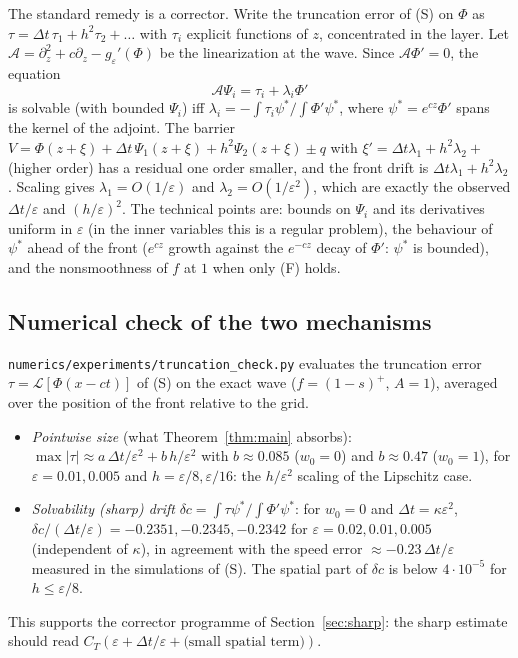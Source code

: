 \documentclass[11pt]{amsart}
\theoremstyle{remark}
\newcommand{\ve}{\varepsilon}
\newcommand{\Lop}{\mathcal{L}}
\begin{document}
The standard remedy is a corrector. Write the truncation error of (S) on
$\Phi$ as $\tau=\Delta t\,\tau_1+h^2\tau_2+\dots$ with $\tau_i$ explicit
functions of $z$, concentrated in the layer. Let $\mathcal A=\partial_z^2+c\partial_z-g_\ve'(\Phi)$
be the linearization at the wave. Since $\mathcal A\Phi'=0$, the equation
\[
\mathcal A\Psi_i=\tau_i+\lambda_i\Phi'
\]
is solvable (with bounded $\Psi_i$) iff
$\lambda_i=-\int\tau_i\psi^*/\int\Phi'\psi^*$, where $\psi^*=e^{cz}\Phi'$
spans the kernel of the adjoint. The barrier
$V=\Phi(z+\xi)+\Delta t\,\Psi_1(z+\xi)+h^2\Psi_2(z+\xi)\pm q$ with
$\xi'=\Delta t\lambda_1+h^2\lambda_2+$(higher order) has a residual one
order smaller, and the front drift is $\Delta t\lambda_1+h^2\lambda_2$. Scaling
gives $\lambda_1=O(1/\ve)$ and $\lambda_2=O(1/\ve^2)$, which are exactly the
observed $\Delta t/\ve$ and $(h/\ve)^2$. The technical points are: bounds on
$\Psi_i$ and its derivatives uniform in $\ve$ (in the inner variables this is a
regular problem), the behaviour of $\psi^*$ ahead of the front ($e^{cz}$
growth against the $e^{-cz}$ decay of $\Phi'$: $\psi^*$ is bounded), and the
nonsmoothness of $f$ at $1$ when only (F) holds.


\subsection*{Numerical check of the two mechanisms}
\texttt{numerics/experiments/truncation\_check.py} evaluates the truncation
error $\tau=\Lop[\Phi(x-ct)]$ of (S) on the exact wave ($f=(1-s)^+$, $A=1$),
averaged over the position of the front relative to the grid.
\begin{itemize}
\item \emph{Pointwise size} (what Theorem~\ref{thm:main} absorbs):
$\max|\tau|\approx a\,\Delta t/\ve^2+b\,h/\ve^2$ with $b\approx0.085$ ($w_0=0$)
and $b\approx0.47$ ($w_0=1$), for $\ve=0.01,0.005$ and $h=\ve/8,\ve/16$:
the $h/\ve^2$ scaling of the Lipschitz case.
\item \emph{Solvability (sharp) drift}
$\delta c=\int\tau\psi^*/\int\Phi'\psi^*$: for $w_0=0$ and $\Delta t=\kappa\ve^2$,
$\delta c/(\Delta t/\ve)=-0.2351,-0.2345,-0.2342$ for $\ve=0.02,0.01,0.005$
(independent of $\kappa$), in agreement with the speed error
$\approx-0.23\,\Delta t/\ve$ measured in the simulations of (S). The
spatial part of $\delta c$ is below $4\cdot10^{-5}$ for $h\le\ve/8$.
\end{itemize}
This supports the corrector programme of Section~\ref{sec:sharp}: the sharp
estimate should read $C_T(\ve+\Delta t/\ve+\text{(small spatial term)})$.
\end{document}
